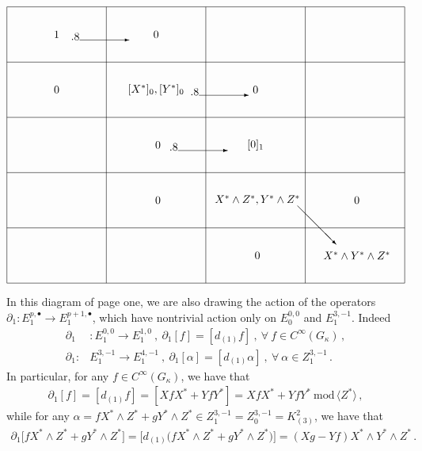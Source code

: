 \documentclass[10pt]{amsart}
\theoremstyle{remark}
\numberwithin{equation}{section}
\begin{document}
\begin{align*}
    \begin{picture}(360,250)(0,0)
   \put(  0,  0){\line( 1, 0){360}}
   \put(  0,  0){\line( 0, 1){250}}
   \multiput(  0, 50)( 0,50){5}{\line( 1, 0){360}}
   \multiput( 90,  0)(90, 0){4}{\line( 0, 1){250}}
   \put(45,225){\makebox(0,0){$ 1$}}
   \put(45,175){\makebox(0,0){$ 0$}}
   \put(135,225){\makebox(0,0){$0$}}
   \put(135,175){\makebox(0,0){$ [X^\ast]_0,[Y^\ast]_0$}}
   \put(135,125){\makebox(0,0){{ $ 0$}}}
   \put(135,75){\makebox(0,0){{ $ 0$}}}
   \put(225,175){\makebox(0,0){$0$}}
   \put(225,125){\makebox(0,0){$[0]_1$}}
   \put(225,75){\makebox(0,0){{ $X^\ast\wedge Z^\ast,Y^\ast\wedge Z^\ast$}}}
   \put(225,25){\makebox(0,0){{ $ 0$}}}
   \put(315,75){\makebox(0,0){{ $0$}}}
   \put(315,25){\makebox(0,0){{ $X^\ast\wedge Y^\ast\wedge Z^\ast$}}}
   \put(58,220){\vector(1,-0.8){45}}
   \put(166,170){\vector(1,-0.8){45}}
   \put(147,120){\vector(1,-0.8){45}}
   \put(263,70){\vector(1,-1){35}}
  \end{picture} 
\end{align*}
In this diagram of page one, we are also drawing the action of the operators $\partial_1\colon E_1^{p,\bullet}\to E_1^{p+1,\bullet}$, which have nontrivial action only on $E_0^{0,0}$ and $E^{3,-1}_1$. Indeed
\begin{align*}
    \partial_1&\colon E^{0,0}_1\to E_1^{1,0}\ ,\ \partial_1[f]=[d_{(1)}f]\ , \ \forall\ f\in C^\infty(G_\kappa)\,,\\
    \partial_1\colon& E_1^{3,-1}\to E_1^{4,-1}\ ,\ \partial_1[\alpha]=[d_{(1)}\alpha]\ ,\ \forall\ \alpha\in Z^{3,-1}_1\,.
\end{align*}
In particular, for any $f\in C^\infty(G_\kappa)$, we have that
\begin{align*}
    \partial_1[f]=[d_{(1)}f]=[XfX^\ast+YfY^\ast]= XfX^\ast+YfY^\ast\ \mathrm{mod}\,\langle Z^\ast\rangle\,,
\end{align*}
while for any $\alpha=fX^\ast\wedge Z^\ast+gY^\ast\wedge Z^\ast\in Z_1^{3,-1}=Z_0^{3,-1}=K_{(3)}^2$, we have that
\begin{align*}
    \partial_1\big[fX^\ast \wedge Z^\ast+gY^\ast\wedge Z^\ast\big]=\big[d_{(1)}\big(fX^\ast \wedge Z^\ast+gY^\ast\wedge Z^\ast\big)\big]=(Xg-Yf) X^\ast\wedge Y^\ast\wedge Z^\ast\,.
\end{align*}
\end{document}
